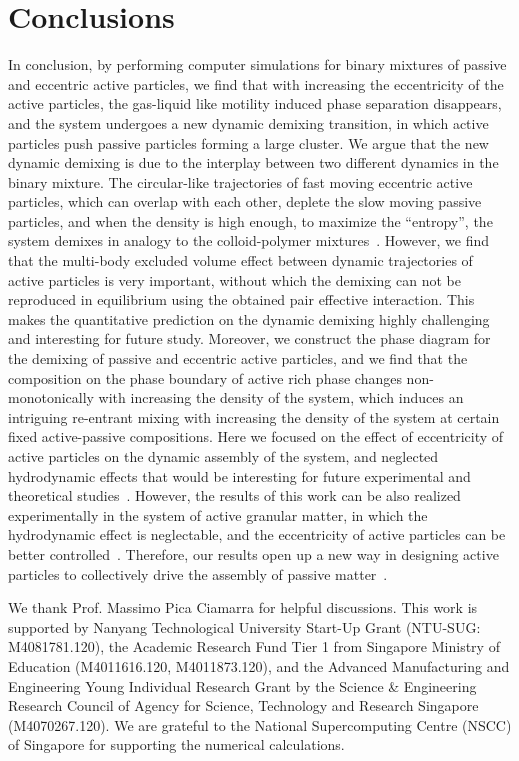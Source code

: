 \documentclass[prl, twocolumn, showpacs, preprintnumbers,amsmath,amssymb]{revtex4-1}
\begin{document}
\section{Conclusions}
In conclusion, by performing computer simulations for binary mixtures of passive and eccentric active particles, we find that with increasing the eccentricity of the active particles, the gas-liquid like motility induced phase separation disappears, and the system undergoes a new dynamic demixing transition, in which active particles push passive particles forming a large cluster. We argue that the new dynamic demixing is due to the interplay between two different dynamics in the binary mixture. The circular-like trajectories of fast moving eccentric active particles, which can overlap with each other, deplete the slow moving passive particles, and when the density is high enough, to maximize the ``entropy'', the system demixes in analogy to the colloid-polymer mixtures~\cite{colloid_polymer,lekkerkerker1992,louis2000can,bolhuis2002i}. However, we find that the multi-body excluded volume effect between dynamic trajectories of active particles is very important, without which the demixing can not be reproduced in equilibrium using the obtained pair effective interaction. 
This makes the quantitative prediction on the dynamic demixing highly challenging and interesting for future study.
Moreover, we construct the phase diagram for the demixing of passive and eccentric active particles, and we find that the composition on the phase boundary of active rich phase changes non-monotonically with increasing the density of the system, which induces an intriguing re-entrant mixing with increasing the density of the system at certain fixed active-passive compositions.
Here we focused on the effect of eccentricity of active particles on the dynamic assembly of the system, and neglected hydrodynamic effects that
would be interesting for future experimental and theoretical studies~\cite{Yamamoto2013}. However, the results of this work can be also realized experimentally in the system of active granular matter, in which the hydrodynamic effect is neglectable, and the eccentricity of active particles can be better controlled~\cite{active_grain,active_grain2}. Therefore, our results open up a new way in designing active particles to collectively drive the assembly of passive matter~\cite{niprl2015,leonado2013,nisoftmatt2014,ni2013natcom}.



\begin{acknowledgments}
We thank Prof. Massimo Pica Ciamarra for helpful discussions. This work is supported by Nanyang Technological University Start-Up Grant (NTU-SUG: M4081781.120), the Academic Research Fund Tier 1 from Singapore Ministry of Education (M4011616.120, M4011873.120), and the Advanced Manufacturing and Engineering Young Individual Research Grant by the Science \& Engineering Research Council of Agency for Science, Technology and Research Singapore (M4070267.120).
We are grateful to the National Supercomputing Centre (NSCC) of Singapore for supporting the numerical calculations.
\end{acknowledgments}




%
%




\clearpage



\clearpage
\end{document}
